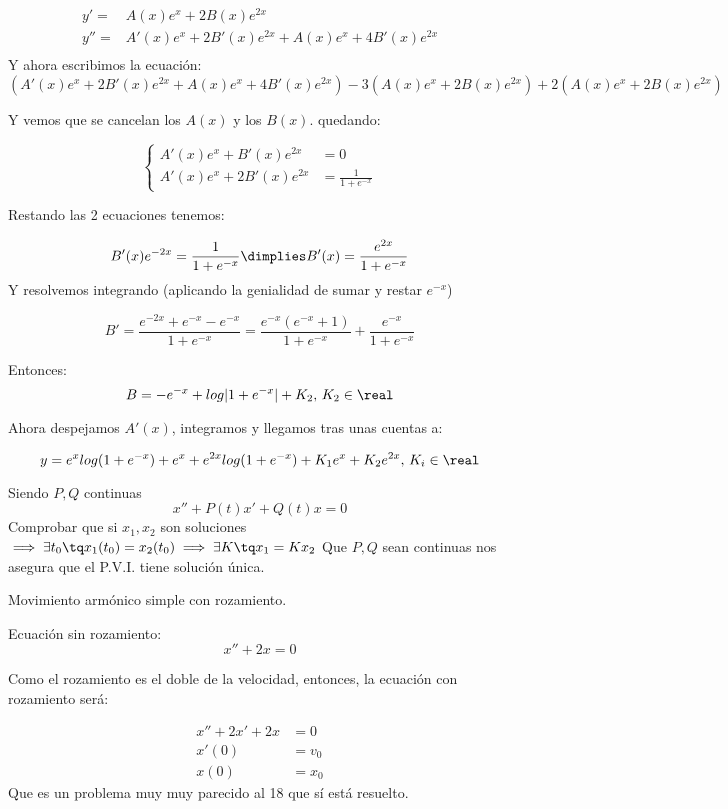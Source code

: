 \documentclass[nochap]{apuntes}
\begin{document}
\begin{problem}[14]
\[\begin{array}{cc}
y' = &A(x)e^x + 2B(x)e^{2x}\\
y'' = &A'(x)e^x + 2B'(x) e^{2x} + A(x)e^x + 4B'(x)e^{2x}\\
\end{array}\]
Y ahora escribimos la ecuación:
\[\left(A'(x)e^x + 2B'(x) e^{2x} + A(x)e^x + 4B'(x)e^{2x}\right) - 3\left(A(x)e^x + 2B(x)e^{2x}\right) + 2 \left(A(x)e^x + 2B(x)e^{2x}\right)\]

Y vemos que se cancelan los $A(x)$ y los $B(x)$. quedando:

\[\left\{\begin{array}{cc}
A'(x)e^x + B'(x)e^{2x} &= 0\\
A'(x)e^x + 2B'(x)e^{2x} &= \frac{1}{1+e^{-x}}
\end{array}\right.
\]

Restando las 2 ecuaciones tenemos:

\[B'(x)e^{-2x} = \frac{1}{1+e^{-x}} \dimplies B'(x) = \frac{e^{2x}}{1+e^{-x}}\]
Y resolvemos integrando (aplicando la genialidad de sumar y restar $e^{-x}$)

\[B'=\frac{e^{-2x}+e^{-x} - e^{-x}}{1+e^{-x}} = \frac{e^{-x}(e^{-x} + 1)}{1+e^{-x}} + \frac{e^{-x}}{1+e^{-x}}\]

Entonces: \[B=-e^{-x} + log|1+e^{-x}| + K_2,\,K_2\in\real\]

Ahora despejamos $A'(x)$, integramos y llegamos tras unas cuentas a:

\[y = e^xlog(1+e^{-x}) + e^x + e^{2x}log(1+e^{-x}) + K_1e^x+K_2e^{2x},\,K_i\in\real\]


\end{problem}


\begin{problem}[16]
Siendo $P,Q$ continuas
\[x''+P(t)x'+ Q(t)x = 0\]
Comprobar que si $x_1,x_2$ son soluciones $\implies \exists t_0 \tq x_1(t_0) = x_2(t_0) \implies \exists K \tq x_1 = Kx_2$
\solution
Que $P,Q$ sean continuas nos asegura que el P.V.I. tiene solución única.

\end{problem}



\begin{problem}[17]

Movimiento armónico simple con rozamiento.

\solution

Ecuación sin rozamiento:
\[x''+2x=0\]

Como el rozamiento es el doble de la velocidad, entonces, la ecuación con rozamiento será:

\[
\begin{array}{cc}
x'' + 2x' + 2x &= 0\\
x'(0)  &= v_0\\
x(0)  &= x_0
\end{array}\]
Que es un problema muy muy parecido al 18 que sí está resuelto.
\end{problem}
\end{document}
